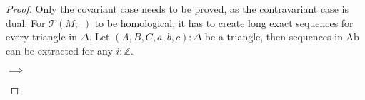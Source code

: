    \begin{proof}
        Only the covariant case needs to be proved, as the contravariant case is dual. For $\mathcal{T}(M,\_)$ to be homological, it has to create long exact sequences for every triangle in $\Delta$. Let $(A,B,C,a,b,c):\Delta$ be a triangle, then sequences in Ab can be extracted for any $i:\mathbb{Z}$.

        \begin{center}
             $\implies$
        \end{center}


\end{proof}
